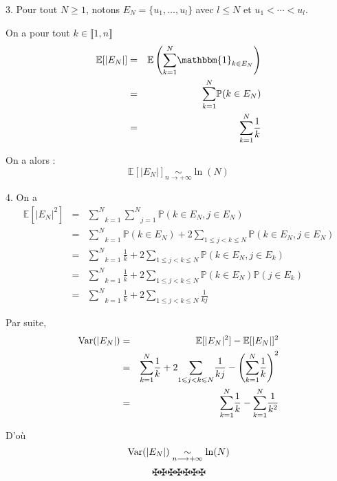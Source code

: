 3. Pour tout $N \geqslant 1$, notons $E_N = \{ u_1, \ldots, u_l \}$ avec $l
\leqslant N$ et $u_1 < \cdots < u_l$.

On a pour tout $k \in \llbracket 1, n \rrbracket$
\begin{eqnarray*}
  \mathbb{E} [| E_N |] & = & \mathbb{E} \left( \underset{k =
  1}{\overset{N}{\sum}} \mathbbm{1}_{k \in E_N} \right)\\
  & = & \underset{k = 1}{\overset{N}{\sum}} \mathbb{P} (k \in E_N)\\
  & = & \underset{k = 1}{\overset{N}{\sum}} \frac{1}{k}
\end{eqnarray*}


On a alors :
\[ \mathbb{E} [| E_N |] \underset{n \longrightarrow + \infty}{\sim} \ln (N) \]


4. On a
\begin{eqnarray*}
  \mathbb{E} [| E_N |^2] & = & \underset{k = 1}{\overset{N}{\sum}} \underset{j
  = 1}{\overset{N}{\sum}} \mathbb{P} (k \in E_N, j \in E_N)\\
  & = & \underset{k = 1}{\overset{N}{\sum}} \mathbb{P} (k \in E_N) + 2
  \underset{1 \leqslant j < k \leqslant N}{\sum} \mathbb{P} (k \in E_N, j \in
  E_N)\\
  & = & \underset{k = 1}{\overset{N}{\sum}} \frac{1}{k} + 2 \underset{1
  \leqslant j < k \leqslant N}{\sum} \mathbb{P} (k \in E_N, j \in E_k)\\
  & = & \underset{k = 1}{\overset{N}{\sum}} \frac{1}{k} + 2 \underset{1
  \leqslant j < k \leqslant N}{\sum} \mathbb{P} (k \in E_N) \mathbb{P} (j \in
  E_k)\\
  & = & \underset{k = 1}{\overset{N}{\sum}} \frac{1}{k} + 2 \underset{1
  \leqslant j < k \leqslant N}{\sum} \frac{1}{k j}
\end{eqnarray*}


Par suite,
\begin{eqnarray*}
  \operatorname{Var} (| E_N |) & = & \mathbb{E} [| E_N |^2] -\mathbb{E} [| E_N |]^2\\
  & = & \underset{k = 1}{\overset{N}{\sum}} \frac{1}{k} + 2 \underset{1
  \leqslant j < k \leqslant N}{\sum} \frac{1}{k j} - \left( \underset{k =
  1}{\overset{N}{\sum}} \frac{1}{k} \right)^2\\
  & = & \underset{k = 1}{\overset{N}{\sum}} \frac{1}{k} - \underset{k =
  1}{\overset{N}{\sum}} \frac{1}{k^2}
\end{eqnarray*}


D'o{\`u}
\[ \operatorname{Var} (| E_N |) \underset{n \longrightarrow + \infty}{\sim} \ln (N) \]
\[ \maltese \maltese \maltese \maltese \maltese \maltese \maltese \]
